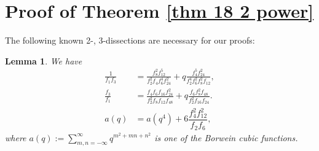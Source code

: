 \documentclass[12pt]{article}
\numberwithin{equation}{section}
\theoremstyle{plain}
\numberwithin{theorem}{section}
\newtheorem{lemma}[theorem]{Lemma}
\theoremstyle{definition}
\theoremstyle{remark}
\begin{document}
    \section{Proof of Theorem \ref{thm 18 2 power}}

    The following known 2-, 3-dissections are necessary for our proofs:
    \begin{lemma}\label{Lemma 2d}\cite[Eq. (22.1.12), Lemma 3]{Hir17, matching}
    We have
    \begin{align}
        \frac{1}{f_1f_3}&=\frac{f_{8}^2 f_{12}^5}{f_{2}^2 f_{4} f_{6}^4 f_{24}^2}+q\frac{f_{4}^5 f_{24}^2}{f_{2}^4 f_{6}^2 f_{8}^2 f_{12}},\label{2dis1byf1f3}\\
        \frac{f_3}{f_1}&=\frac{f_{4} f_{6} f_{16} f_{24}^2}{f_{2}^2 f_{8} f_{12} f_{48}}+q\frac{f_{6} f_{8}^2 f_{48}}{f_{2}^2 f_{16} f_{24}}.\label{2disf3byf1}\\
        a(q)&=a(q^4)+6\dfrac{f_4^2f_{12}^2}{f_2f_6},\label{eq:Borwein}
    \end{align}
    where $\displaystyle{a(q):=\sum _{m,n=-\infty }^\infty q^{m^2+mn+n^2}}$ is one of the Borwein cubic functions.
    \end{lemma}
\end{document}
